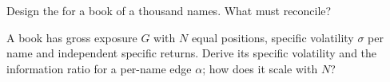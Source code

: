 \begin{interviewq}\label{iq:s1:anatomy-of-a-stat-arb-book:5}
Design the  for a book of a thousand names. What must reconcile?
\end{interviewq}

\begin{interviewq}\label{iq:s1:anatomy-of-a-stat-arb-book:6}
A book has gross exposure $G$ with $N$ equal positions, specific volatility $\sigma$ per name and independent specific returns. Derive its specific volatility and the
information ratio for a per-name edge $\alpha$; how does it scale with $N$?
\end{interviewq}
